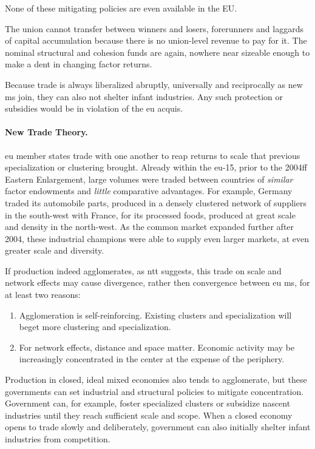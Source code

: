None of these mitigating policies are even available in the EU.

The union cannot transfer between winners and losers, forerunners and laggards of capital accumulation because there is no union-level revenue to pay for it.
The nominal structural and cohesion funds are again, nowhere near sizeable enough to make a dent in changing factor returns.

Because trade is always liberalized abruptly, universally and reciprocally as new \gls{ms} join, they can also not shelter infant industries.
Any such protection or subsidies would be in violation of the \gls{eu} acquis.

\paragraph{New Trade Theory.}
	\label{sec:ntt}
\gls{eu} member states trade with one another to reap returns to scale that previous specialization or clustering brought.
Already within the \gls{eu}-15, prior to the 2004ff Eastern Enlargement, large volumes were traded between countries of \emph{similar} factor endowments and \emph{little} comparative advantages.
For example, Germany traded its automobile parts, produced in a densely clustered network of suppliers in the south-west with France, for its processed foods, produced at great scale and density in the north-west.
As the common market expanded further after 2004, these industrial champions were able to supply even larger markets, at even greater scale and diversity.

If production indeed agglomerates, as \gls{ntt} suggests, this trade on scale and network effects may cause divergence, rather then convergence between \gls{eu} \gls{ms}, for at least two reasons:
\begin{enumerate}
	\item Agglomeration is self-reinforcing.
	Existing clusters and specialization will beget more clustering and specialization.
	\item For network effects, distance and space matter.
	Economic activity may be increasingly concentrated in the center at the expense of the periphery.
\end{enumerate}

Production in closed, ideal mixed economies also tends to agglomerate, but these governments can set industrial and structural policies to mitigate concentration.
Government can, for example, foster specialized clusters or subsidize nascent industries until they reach sufficient scale and scope.
When a closed economy opens to trade slowly and deliberately, government can also initially shelter infant industries from competition.

